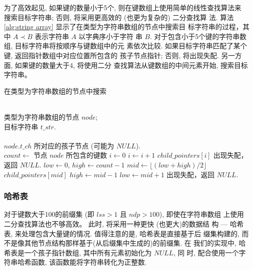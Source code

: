 \documentclass{ws-ijprai}
\begin{document}
为了高效起见, 如果键的数量小于5个, 则在键数组上使用简单的线性查找算法来
搜索目标字符串; 否则, 将采用更高效的 (也更为复杂的) 二分查找算
法. 算法 \ref{alg:string array} 显示了在类型为字符串数组的节点中搜索目
标字符串的过程，其中 $A \prec B$ 表示字符串 $A$ 以字典序小于字符
串 $B$. 对于包含小于5个键的字符串数组, 目标字符串将按顺序与键数组中的元
素依次比较. 如果目标字符串匹配了某个键, 返回指针数组中对应位置所包含的
孩子节点指针; 否则, 将出现失配. 另一方面, 如果键的数量大于4, 将使用二分
查找算法从键数组的中间元素开始, 搜索目标字符串。

\begin{algorithm}
  \caption{在类型为字符串数组的节点中搜索}\scriptsize
  \label{alg:string array}
  \begin{algorithmic}[1]
    \REQUIRE ~~\\
    类型为字符串数组的节点 $node$; \\
    目标字符串 $t\_str$.\\
    \ENSURE ~~\\
     $node.t\_ch$ 所对应的孩子节点 (可能为 $NULL$).\\
    \STATE
    \STATE $count \leftarrow$ 节点 $node$  所包含的键数
    \STATE
    \STATE $i \leftarrow 0$
    \STATE $i \leftarrow i+1$
    \ENDWHILE
    \RETURN $child\_pointers[i]$
    \ELSE
    \STATE 出现失配，返回 $NULL$.
    \ENDIF
    \ELSE
    \STATE $low \leftarrow 0$, $high \leftarrow count-1$
    \STATE $mid \leftarrow \lfloor (low+high)/2 \rfloor$
    \RETURN $child\_pointers[mid]$
    \STATE $high \leftarrow mid - 1$
    \ELSE
    \STATE $low \leftarrow mid + 1$
    \ENDIF
    \ENDWHILE
    \STATE 出现失配，返回 $NULL$.
    \ENDIF
  \end{algorithmic}
\end{algorithm}

\subsubsection{哈希表}
\label{sec:hash table}

对于键数大于100的前缀集 (即 $lss > 1$ 且 $ndp > 100$), 即使在字符串数组
上使用二分查找算法也不够高效。 此时, 将采用一种更快 (也更大)的数据结
构 --- 哈希表, 来处理包含大量键的情况. 值得注意的是, 哈希表是直接基于后
缀集构建的, 而不是像其他节点结构那样基于(从后缀集中生成的)的前缀集. 在
我们的实现中, 哈希表是一个孩子指针数组, 其中所有元素初始化为 $NULL$, 同
时, 配合使用一个字符串哈希函数, 该函数能将字符串转化为正整数.
\end{document}
